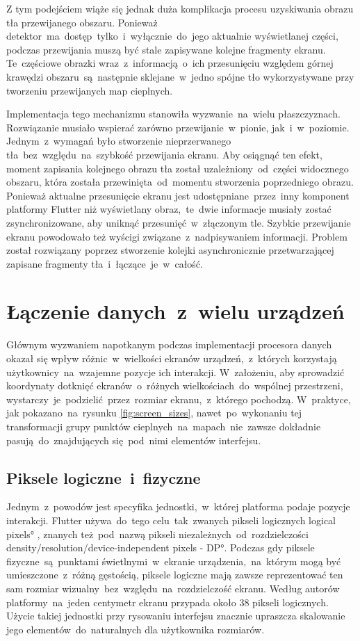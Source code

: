 Z tym podejściem wiąże się jednak duża komplikacja procesu uzyskiwania obrazu tła przewijanego obszaru. Ponieważ detektor~ma~dostęp~tylko~i~wyłącznie~do~jego aktualnie wyświetlanej części, podczas przewijania muszą być stale zapisywane kolejne fragmenty ekranu. Te~częściowe obrazki wraz~z~informacją~o~ich przesunięciu względem górnej krawędzi obszaru~są~następnie sklejane~w~jedno spójne tło wykorzystywane przy tworzeniu przewijanych map cieplnych.

Implementacja tego mechanizmu stanowiła wyzwanie~na~wielu płaszczyznach. Rozwiązanie musiało wspierać zarówno przewijanie~w~pionie, jak~i~w~poziomie. Jednym~z~wymagań było stworzenie nieprzerwanego tła~bez~względu~na~szybkość przewijania ekranu. Aby osiągnąć ten efekt, moment zapisania kolejnego obrazu tła został uzależniony~od~części widocznego obszaru, która została przewinięta~od~momentu stworzenia poprzedniego obrazu. Ponieważ aktualne przesunięcie ekranu jest udostępniane~przez~inny komponent platformy Flutter niż wyświetlany obraz,~te~dwie informacje musiały zostać zsynchronizowane, aby uniknąć przesunięć~w~złączonym tle. Szybkie przewijanie ekranu powodowało też wyścigi związane~z~nadpisywaniem informacji. Problem został rozwiązany poprzez stworzenie kolejki asynchronicznie przetwarzającej zapisane fragmenty tła~i~łączące~je~w~całość.

\section{Łączenie danych~z~wielu urządzeń}
Głównym wyzwaniem napotkanym podczas implementacji procesora danych okazał się wpływ różnic~w~wielkości ekranów urządzeń,~z~których korzystają użytkownicy~na~wzajemne pozycje ich interakcji. W~założeniu, aby sprowadzić koordynaty dotknięć ekranów~o~różnych wielkościach~do~wspólnej przestrzeni, wystarczy~je~podzielić~przez~rozmiar ekranu,~z~którego pochodzą. W~praktyce, jak pokazano~na~rysunku \ref{fig:screen_sizes}, nawet~po~wykonaniu tej transformacji grupy punktów cieplnych~na~mapach~nie~zawsze dokładnie pasują~do~znajdujących się~pod~nimi elementów interfejsu. 

\subsection{Piksele logiczne~i~fizyczne}
Jednym~z~powodów jest specyfika jednostki,~w~której platforma podaje pozycje interakcji. Flutter używa~do~tego celu~tak~zwanych pikseli logicznych \ang{logical pixels} \cite{Logic_pixels}, znanych też~pod~nazwą pikseli niezależnych~od~rozdzielczości \ang{density/resolution/device-independent pixels - DP}. Podczas gdy piksele fizyczne~są~punktami świetlnymi~w~ekranie urządzenia,~na~którym mogą być umieszczone~z~różną gęstością, piksele logiczne mają zawsze reprezentować ten sam rozmiar wizualny~bez~względu~na~rozdzielczość ekranu. Według autorów platformy~na~jeden centymetr ekranu przypada około 38 pikseli logicznych. Użycie takiej jednostki przy rysowaniu interfejsu znacznie upraszcza skalowanie jego elementów~do~naturalnych dla użytkownika rozmiarów.

